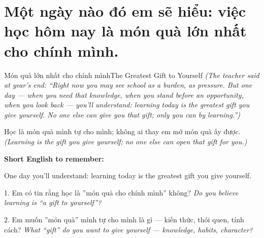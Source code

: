 \section{Một ngày nào đó em sẽ hiểu: việc học hôm nay là món quà lớn nhất cho chính mình.}
\begin{truyen}{Món quà lớn nhất cho chính mình}{The Greatest Gift to Yourself}
\textit{(The teacher said at year's end: ``Right now you may see school as a burden, as pressure. But one day — when you need that knowledge, when you stand before an opportunity, when you look back — you'll understand: learning today is the greatest gift you give yourself. No one else can give you that gift; only you can by learning.'')}
\end{truyen}

\begin{baihoc}
Học là món quà mình tự cho mình; không ai thay em mở món quà ấy được.
\textit{(Learning is the gift you give yourself; no one else can open that gift for you.)}
\end{baihoc}

\begin{ghinhoanh}
\textbf{Short English to remember:}

One day you'll understand: learning today is the greatest gift you give yourself.

\end{ghinhoanh}

\begin{tuhocnhanh}
1. Em có tin rằng học là ''món quà cho chính mình'' không? \textit{Do you believe learning is ``a gift to yourself''?}

2. Em muốn ''món quà'' mình tự cho mình là gì — kiến thức, thói quen, tính cách? \textit{What ``gift'' do you want to give yourself — knowledge, habits, character?}
\end{tuhocnhanh}
\ngancach
